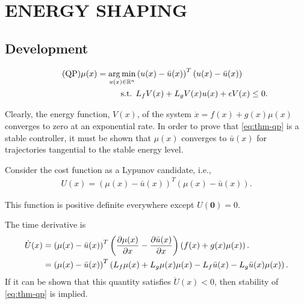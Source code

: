 \chapter{\uppercase{Energy Shaping}}

\section{Development}

\begin{align}
  \label{eq:thm-qp} \tag {QP}
  \mu(x) = \operatorname*{arg\,min}_{u(x) \in \mathbb{R}^{n}} & \left(u(x) - {\bar u}(x)\right)^T \left(u(x) - {\bar u}(x) \right)\\
  \nonumber
  \mbox{s.t. } & L_{f} V(x) + L_{g} V(x) u(x) + \epsilon V(x) \leq 0.
\end{align}

Clearly, the energy function, $V(x)$, of the system ${\dot x} = f(x) + g(x) \mu(x)$ converges to zero at an exponential rate. In order to prove that \eqref{eq:thm-qp} is a stable controller, it must be shown that $\mu(x)$ converges to ${\bar u}(x)$ for trajectories tangential to the stable energy level.

Consider the cost function as a Lypunov candidate, i.e.,
\begin{align*}
  U(x) = \left(\mu(x) - {\bar u}(x)\right)^T \left(\mu(x) - {\bar u}(x) \right).
\end{align*}

This function is positive definite everywhere except $U(\mathbf{0}) = 0$.

The time derivative is
\begin{align*}
  {\dot U}(x) &= \left(\mu(x) - {\bar u}(x)\right)^T \left(\frac{\partial{\mu(x)}}{\partial{x}} - \frac{\partial{{\bar u}(x)}}{\partial{x}}\right) \left(f(x) + g(x) \mu(x)\right).\\
  &= \left(\mu(x) - {\bar u}(x)\right)^T \left(L_{f} \mu(x) + L_{g} \mu(x) \mu(x)
  - L_{f} {\bar u}(x) - L_{g} {\bar u}(x) \mu(x) \right).
\end{align*}
If it can be shown that this quantity satisfies ${\dot U}(x) < 0$, then stability of \eqref{eq:thm-qp} is implied.

